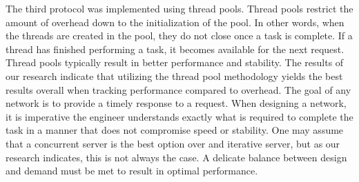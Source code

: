The third protocol was implemented using thread pools. 
Thread pools restrict the amount of overhead down to the initialization of the pool. 
In other words, when the threads are created in the pool, they do not close once a task is complete. 
If a thread has finished performing a task, it becomes available for the next request. 
Thread pools typically result in better performance and stability. 
The results of our research indicate that utilizing the thread pool methodology yields the best results overall when tracking performance compared to overhead.
The goal of any network is to provide a timely response to a request. 
When designing a network, it is imperative the engineer understands exactly what is required to complete the task in a manner that does not compromise speed or stability. 
One may assume that a concurrent server is the best option over and iterative server, but as our research indicates, this is not always the case. 
A delicate balance between design and demand must be met to result in optimal performance.